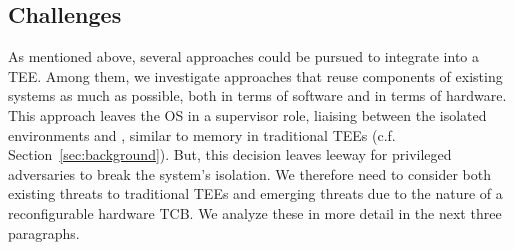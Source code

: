 \subsection{Challenges}
\label{pue:sec:problemStatement:challenges}
As mentioned above, several approaches could be pursued to integrate \sphw into a TEE. Among them, we investigate approaches that reuse components of existing systems as much as possible, both in terms of software and in terms of hardware.  
This approach leaves the OS in a supervisor role, liaising between the isolated environments and \sphw, similar to memory in traditional TEEs (c.f. Section~\ref{sec:background}). But, this decision leaves leeway for privileged adversaries to break the system's isolation. We therefore need to consider both existing threats to traditional TEEs and emerging threats due to the nature of a reconfigurable hardware TCB. 
We analyze these in more detail in the next three paragraphs.


